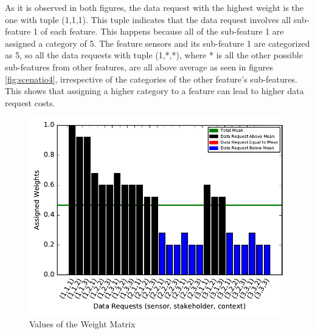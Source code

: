 As it is observed in both figures, the data request with the highest weight is the one with tuple (1,1,1). This tuple indicates that the data request involves all sub-feature 1 of each feature. This happens because all of the sub-feature 1 are assigned a category of 5. The feature sensors and its sub-feature 1 are categorized as 5, so all the data requests
with tuple (1,*,*), where * is all the other possible sub-features from other features, are all above average as seen in figures \ref{fig:scenatio4}, irrespective of the categories of the other feature's sub-features. This shows that assigning a higher category to a feature can lead to higher data request costs. 



\begin{figure}[ht!]
\centering
\includegraphics[width=\textwidth,keepaspectratio]{./images/weight_4}
\caption{Values of the Weight Matrix\label{weight4}}
\end{figure}


